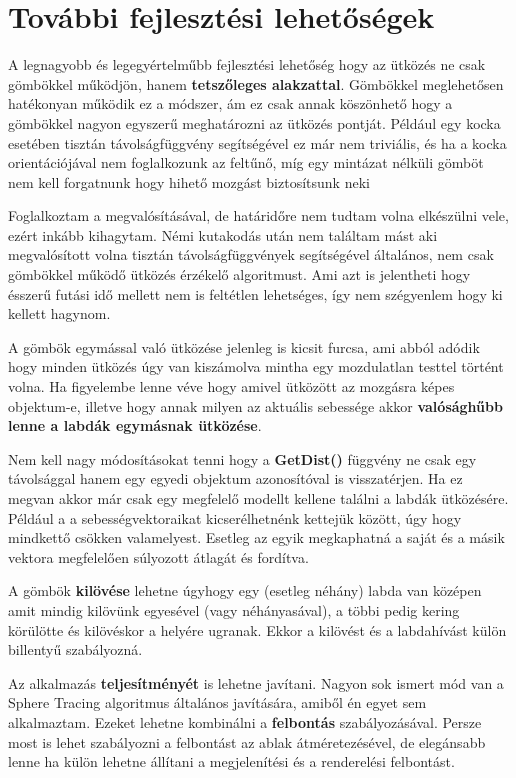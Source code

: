 \chapter{További fejlesztési lehetőségek}
\label{ch:more}

A legnagyobb és legegyértelműbb fejlesztési lehetőség hogy az ütközés ne csak gömbökkel működjön, hanem \textbf{tetszőleges alakzattal}. Gömbökkel meglehetősen hatékonyan működik ez a módszer, ám ez csak annak köszönhető hogy a gömbökkel nagyon egyszerű meghatározni az ütközés pontját. Például egy kocka esetében tisztán távolságfüggvény segítségével ez már nem triviális, és ha a kocka orientációjával nem foglalkozunk az feltűnő, míg egy mintázat nélküli gömböt nem kell forgatnunk hogy hihető mozgást biztosítsunk neki

Foglalkoztam a megvalósításával, de határidőre nem tudtam volna elkészülni vele, ezért inkább kihagytam. Némi kutakodás után nem találtam mást aki megvalósított volna tisztán távolságfüggvények segítségével általános, nem csak gömbökkel működő ütközés érzékelő algoritmust. Ami azt is jelentheti hogy ésszerű futási idő mellett nem is feltétlen lehetséges, így nem szégyenlem hogy ki kellett hagynom.

A gömbök egymással való ütközése jelenleg is kicsit furcsa, ami abból adódik hogy minden ütközés úgy van kiszámolva mintha egy mozdulatlan testtel történt volna. Ha figyelembe lenne véve hogy amivel ütközött az mozgásra képes objektum-e, illetve hogy annak milyen az aktuális sebessége akkor \textbf{valósághűbb lenne a labdák egymásnak ütközése}.

Nem kell nagy módosításokat tenni hogy a \textbf{GetDist()} függvény ne csak egy távolsággal hanem egy egyedi objektum azonosítóval is visszatérjen. Ha ez megvan akkor már csak egy megfelelő modellt kellene találni a labdák ütközésére. Például a a sebességvektoraikat kicserélhetnénk kettejük között, úgy hogy mindkettő csökken valamelyest. Esetleg az egyik megkaphatná a saját és a másik vektora megfelelően súlyozott átlagát és fordítva.

A gömbök \textbf{kilövése} lehetne úgyhogy egy (esetleg néhány) labda van középen amit mindig kilövünk egyesével (vagy néhányasával), a többi pedig kering körülötte és kilövéskor a helyére ugranak. Ekkor a kilövést és a labdahívást külön billentyű szabályozná. 

Az alkalmazás \textbf{teljesítményét} is lehetne javítani. Nagyon sok ismert mód van a Sphere Tracing algoritmus általános javítására, amiből én egyet sem alkalmaztam. Ezeket lehetne kombinálni a \textbf{felbontás} szabályozásával. Persze most is lehet szabályozni a felbontást az ablak átméretezésével, de elegánsabb lenne ha külön lehetne állítani a megjelenítési és a renderelési felbontást.

